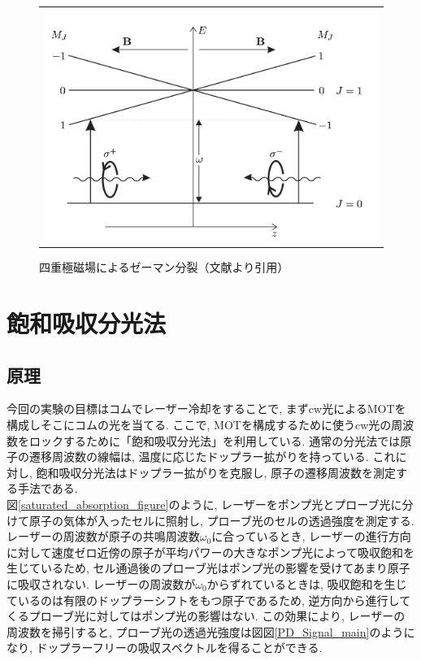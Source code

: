 \documentclass[uplatex, dvipdfmx, a4paper, report, papersize, 11pt]{jsbook}
\begin{document}
\begin{figure}[htpb]
\begin{tabular}{c}
      \begin{minipage}{0.50\hsize}
        \centering
          \includegraphics[keepaspectratio,  scale=0.40,  angle=0]
                          {figures/chapter2/MOT_zeeman_split.png}
                          \caption{四重極磁場によるゼーマン分裂（文献\cite{Foot:1080846}より引用）}
                          \label{MOT_zeeman_split}
      \end{minipage}


    \end{tabular}
\end{figure}

\newpage
\section{飽和吸収分光法}
\subsection{原理}
今回の実験の目標はコムでレーザー冷却をすることで, まずcw光によるMOTを構成しそこにコムの光を当てる. ここで, MOTを構成するために使うcw光の周波数をロックするために「飽和吸収分光法」を利用している. 通常の分光法では原子の遷移周波数の線幅は, 温度に応じたドップラー拡がりを持っている. これに対し, 飽和吸収分光法はドップラー拡がりを克服し, 原子の遷移周波数を測定する手法である. \\図\ref{saturated_absorption_figure}のように, レーザーをポンプ光とプローブ光に分けて原子の気体が入ったセルに照射し, プローブ光のセルの透過強度を測定する.\\
レーザーの周波数が原子の共鳴周波数$\omega_0$に合っているとき, レーザーの進行方向に対して速度ゼロ近傍の原子が平均パワーの大きなポンプ光によって吸収飽和を生じているため, セル通過後のプローブ光はポンプ光の影響を受けてあまり原子に吸収されない. レーザーの周波数が$\omega_0$からずれているときは, 吸収飽和を生じているのは有限のドップラーシフトをもつ原子であるため, 逆方向から進行してくるプローブ光に対してはポンプ光の影響はない. この効果により, レーザーの周波数を掃引すると, プローブ光の透過光強度は図図\ref{PD_Signal_main}のようになり, ドップラーフリーの吸収スペクトルを得ることができる.
\end{document}
